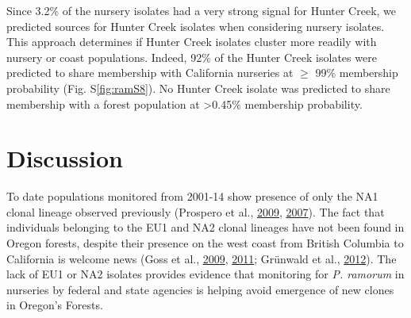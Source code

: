 \documentclass[double,12pt]{beavtex}
\begin{document}
  Since 3.2\% of the nursery isolates had a very strong signal for Hunter
  Creek, we predicted sources for Hunter Creek isolates when considering
  nursery isolates. This approach determines if Hunter Creek isolates
  cluster more readily with nursery or coast populations. Indeed, 92\% of
  the Hunter Creek isolates were predicted to share membership with
  California nurseries at \(\geq\) 99\% membership probability (Fig.
  S\ref{fig:ramS8}). No Hunter Creek isolate was predicted to share
  membership with a forest population at \textgreater{}0.45\% membership
  probability.
  
  \section{Discussion}\label{discussion-1}
  
  To date populations monitored from 2001-14 show presence of only the NA1
  clonal lineage observed previously (Prospero et al.,
  \protect\hyperlink{ref-prospero2009migration}{2009},
  \protect\hyperlink{ref-prospero2007population}{2007}). The fact that
  individuals belonging to the EU1 and NA2 clonal lineages have not been
  found in Oregon forests, despite their presence on the west coast from
  British Columbia to California is welcome news (Goss et al.,
  \protect\hyperlink{ref-goss2009population}{2009},
  \protect\hyperlink{ref-goss2011phytophthora}{2011}; Grünwald et al.,
  \protect\hyperlink{ref-grunwald2012emergence}{2012}). The lack of EU1 or
  NA2 isolates provides evidence that monitoring for \emph{P. ramorum} in
  nurseries by federal and state agencies is helping avoid emergence of
  new clones in Oregon's Forests.
  
\end{document}
